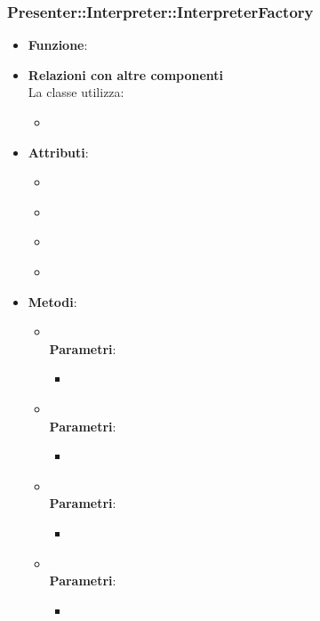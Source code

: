 \subsubsection{Presenter::Interpreter::InterpreterFactory}
\begin{itemize}
\item\textbf{Funzione}:
\item\textbf{Relazioni con altre componenti}\\
La classe utilizza:
	\begin{itemize}
		\item
	\end{itemize}
\item\textbf{Attributi}:
	\begin{itemize}
		\item\code{}\\
		\item\code{}\\
		\item\code{}\\
		\item\code{}\\
	\end{itemize}
\item\textbf{Metodi}:
	\begin{itemize}
		\item\code{}\\
		\textbf{Parametri}:
			\begin{itemize}
				\item\code{}\\
			\end{itemize}
		\item\code{}\\
		\textbf{Parametri}:
			\begin{itemize}
				\item\code{}\\
			\end{itemize}
		\item\code{}\\
		\textbf{Parametri}:
			\begin{itemize}
				\item\code{}\\
			\end{itemize}
		\item\code{}\\
		\textbf{Parametri}:
			\begin{itemize}
				\item\code{}\\
			\end{itemize}
	\end{itemize}
\end{itemize}

